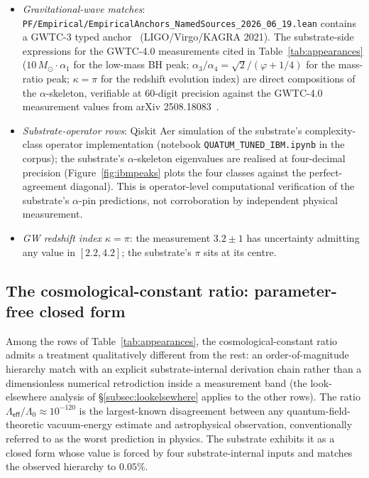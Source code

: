 \documentclass[11pt,a4paper]{amsart}
\theoremstyle{plain}
\theoremstyle{definition}
\begin{document}
\begin{itemize}[itemsep=2pt]
\item \emph{Gravitational-wave matches}: \texttt{PF/Empirical/EmpiricalAnchors\_NamedSources\_2026\_06\_19.lean} contains a GWTC-3 typed anchor~\cite{gwtc3} (LIGO/Virgo/KAGRA 2021). The substrate-side expressions for the GWTC-4.0 measurements cited in Table~\ref{tab:appearances} ($10\,M_\odot\cdot\alpha_1$ for the low-mass BH peak; $\alpha_3/\alpha_4 = \sqrt{2}/(\varphi+1/4)$ for the mass-ratio peak; $\kappa = \pi$ for the redshift evolution index) are direct compositions of the $\alpha$-skeleton, verifiable at 60-digit precision against the GWTC-4.0 measurement values from arXiv 2508.18083~\cite{gwtc4}.
\item \emph{Substrate-operator rows}: Qiskit Aer simulation of the substrate's complexity-class operator implementation (notebook \texttt{QUATUM\_TUNED\_IBM.ipynb} in the corpus); the substrate's $\alpha$-skeleton eigenvalues are realised at four-decimal precision (Figure~\ref{fig:ibmpeaks} plots the four classes against the perfect-agreement diagonal). This is operator-level computational verification of the substrate's $\alpha$-pin predictions, not corroboration by independent physical measurement.
\item \emph{GW redshift index $\kappa = \pi$}: the measurement $3.2 \pm 1$ has uncertainty admitting any value in $[2.2, 4.2]$; the substrate's $\pi$ sits at its centre.
\end{itemize}

\subsection{The cosmological-constant ratio: parameter-free closed form}\label{subsec:lambdaeff}

Among the rows of Table~\ref{tab:appearances}, the cosmological-constant ratio admits a treatment qualitatively different from the rest: an order-of-magnitude hierarchy match with an explicit substrate-internal derivation chain rather than a dimensionless numerical retrodiction inside a measurement band (the look-elsewhere analysis of \S\ref{subsec:lookelsewhere} applies to the other rows). The ratio $\Lambda_{\textsf{eff}}/\Lambda_0 \approx 10^{-120}$ is the largest-known disagreement between any quantum-field-theoretic vacuum-energy estimate and astrophysical observation, conventionally referred to as the worst prediction in physics. The substrate exhibits it as a closed form whose value is forced by four substrate-internal inputs and matches the observed hierarchy to $0.05\%$.
\end{document}
